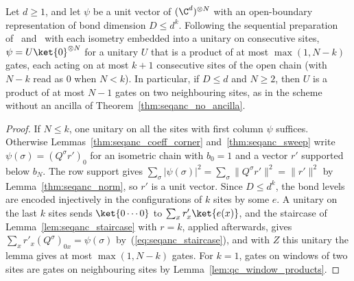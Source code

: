 \begin{lemma}
    \label{thm:seqanc_staircase_preparation}
    \leanok
    Let $d\ge1$, and let $\psi$ be a unit vector of $(\C^d)^{\otimes N}$ with an
    open-boundary representation of bond dimension $D\le d^k$. Following the sequential preparation
    of~\cite{Schoen2005Sequential} and~\cite[paragraph ``The sequential-RG
        circuit'']{Malz2024Preparation} with each isometry embedded into a
    unitary on consecutive sites,
    $\psi=U\ket{0}^{\otimes N}$ for a unitary $U$ that is a product of at most
    $\max(1,N-k)$ gates, each acting on at most $k+1$ consecutive sites of the
    open chain (with $N-k$ read as $0$ when $N<k$). In particular, if $D\le d$
    and $N\ge2$, then $U$ is a product of at most $N-1$ gates on two
    neighbouring sites, as in the scheme without an ancilla of
    Theorem~\ref{thm:seqanc_no_ancilla}.
\end{lemma}
\begin{proof}
    \leanok
    If $N\le k$, one unitary on all the sites with first column $\psi$
    suffices. Otherwise Lemmas~\ref{thm:seqanc_coeff_corner}
    and~\ref{thm:seqanc_sweep} write $\psi(\sigma)=(Q^\sigma r')_0$ for an
    isometric chain with $b_0=1$ and a vector $r'$ supported below $b_N$. The
    row support gives $\sum_\sigma|\psi(\sigma)|^2=\sum_\sigma\|Q^\sigma
        r'\|^2=\|r'\|^2$ by Lemma~\ref{thm:seqanc_norm}, so $r'$ is a unit
    vector. Since $D\le d^k$, the bond levels are encoded injectively in the
    configurations of $k$ sites by some $e$. A unitary on the last $k$ sites
    sends $\ket{0\cdots0}$ to $\sum_x r'_x\ket{e(x)}$, and the staircase of
    Lemma~\ref{lem:seqanc_staircase} with $r=k$, applied afterwards, gives
    $\sum_x r'_x(Q^\sigma)_{0x}=\psi(\sigma)$ by~(\ref{eq:seqanc_staircase}),
    and with $Z$ this unitary the lemma gives at most $\max(1,N-k)$ gates. For
    $k=1$, gates on windows of two sites are
    gates on neighbouring sites by Lemma~\ref{lem:qc_window_products}.
\end{proof}

